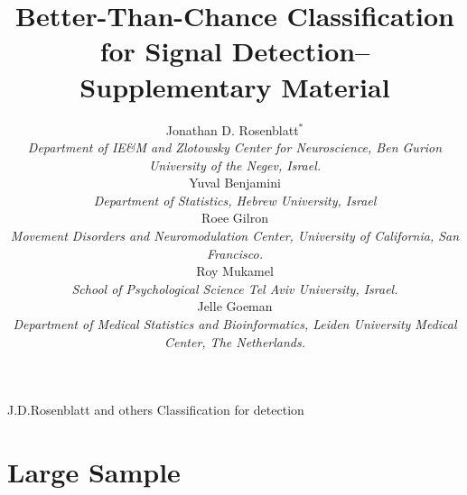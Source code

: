 \documentclass[]{bio}
\begin{document}
\title{Better-Than-Chance Classification for Signal Detection-- Supplementary Material}

\author{Jonathan D. Rosenblatt$^\ast$ \\ 
	\textit{Department of IE\&M and Zlotowsky Center for Neuroscience, 
		Ben Gurion University of the Negev, Israel.} 
	\\ Yuval Benjamini \\
	\textit{Department of Statistics, Hebrew University, Israel}	
	\\ Roee Gilron \\ 
	\textit{Movement Disorders and Neuromodulation Center, University of California, San Francisco.}
	\\ Roy Mukamel \\ 
	\textit{School of Psychological Science Tel Aviv University, Israel.}
	\\ Jelle Goeman \\ 
	\textit{Department of Medical Statistics and Bioinformatics, Leiden University Medical Center, The Netherlands.}
}


\markboth%
{J.D.Rosenblatt and others}
{Classification for detection}

\maketitle



\section{Large Sample}
\end{document}
